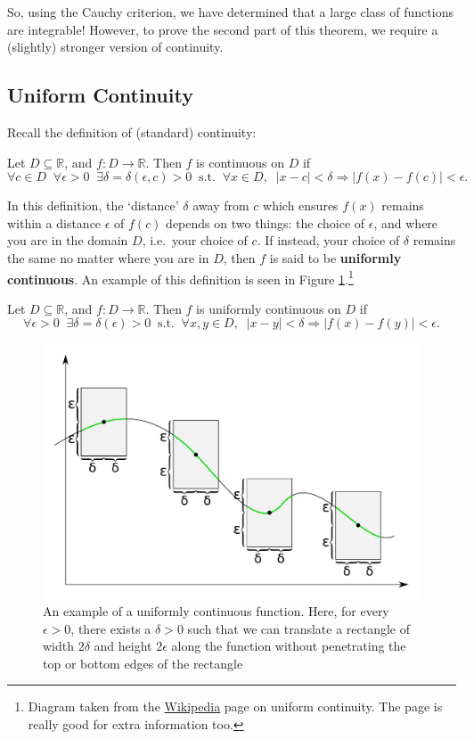 \documentclass[
  10pt,
  a4paper]{article}
\theoremstyle{plain}
\theoremstyle{definition}
\theoremstyle{plain}
\theoremstyle{plain}
\theoremstyle{plain}
\theoremstyle{plain}
\theoremstyle{definition}
\theoremstyle{definition}
\theoremstyle{remark}
\theoremstyle{remark}
\let\BeginKnitrBlock\begin \let\EndKnitrBlock\end
\begin{document}
So, using the Cauchy criterion, we have determined that a large class of functions are integrable! However, to prove the second part of this theorem, we require a (slightly) stronger version of continuity.

\hypertarget{uniform-continuity}{%
\subsection{Uniform Continuity}\label{uniform-continuity}}

Recall the definition of (standard) continuity:

\BeginKnitrBlock{definition}[Continuity]
{\label{def:def3} }Let \(D \subseteq \mathbb{R}\), and \(f: D \to \mathbb{R}\). Then \(f\) is continuous on \(D\) if \[\forall c \in D\;\;\forall \epsilon > 0\;\;\exists \delta = \delta(\epsilon,c) > 0\;\;\text{s.t.}\;\;\forall x \in D,\;\; \lvert x - c \rvert < \delta \Rightarrow \lvert f(x) - f(c) \rvert < \epsilon.\]
\EndKnitrBlock{definition}

In this definition, the `distance' \(\delta\) away from \(c\) which ensures \(f(x)\) remains within a distance \(\epsilon\) of \(f(c)\) depends on two things: the choice of \(\epsilon\), and where you are in the domain \(D\), i.e.~your choice of \(c\). If instead, your choice of \(\delta\) remains the same no matter where you are in \(D\), then \(f\) is said to be \textbf{uniformly continuous}. An example of this definition is seen in Figure \ref{fig:unicont}.\footnote{Diagram taken from the \href{https://en.wikipedia.org/wiki/Uniform_continuity}{Wikipedia} page on uniform continuity. The page is really good for extra information too.}

\BeginKnitrBlock{definition}[Uniform Continuity]
{\label{def:def4} }Let \(D \subseteq \mathbb{R}\), and \(f: D \to \mathbb{R}\). Then \(f\) is uniformly continuous on \(D\) if \[\forall \epsilon > 0\;\;\exists \delta = \delta(\epsilon) > 0\;\;\text{s.t.}\;\;\forall x,y \in D,\;\; \lvert x - y \rvert < \delta \Rightarrow \lvert f(x) - f(y) \rvert < \epsilon.\]
\EndKnitrBlock{definition}

\begin{figure}

{\centering \includegraphics[width=0.5\linewidth]{UniCont} 

}

\caption{An example of a uniformly continuous function. Here, for every $\epsilon > 0$, there exists a $\delta > 0$ such that we can translate a rectangle of width $2\delta$ and height $2\epsilon$ along the function without penetrating the top or bottom edges of the rectangle}\label{fig:unicont}
\end{figure}
\end{document}
